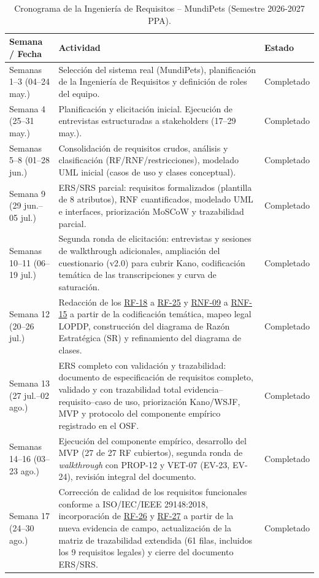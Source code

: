 \documentclass[journal,onecolumn]{IEEEtran}
\begin{document}
	\begin{table}[H]
		\caption{Cronograma de la Ingeniería de Requisitos -- MundiPets (Semestre 2026-2027 PPA).}
		\centering
		
		\begin{tabularx}{\linewidth}{|C{2.5cm}|X|C{2.8cm}|}
			\hline
			\textbf{Semana / Fecha} & \textbf{Actividad} & \textbf{Estado} \\
			\hline
			Semanas 1--3 (04--24 may.) & Selección del sistema real (MundiPets), planificación de la Ingeniería de Requisitos y definición de roles del equipo. & Completado \\
			\hline
			Semana 4 (25--31 may.) & Planificación y elicitación inicial. Ejecución de entrevistas estructuradas a stakeholders (17--29 may.). & Completado \\
			\hline
			Semanas 5--8 (01--28 jun.) & Consolidación de requisitos crudos, análisis y clasificación (RF/RNF/restricciones), modelado UML inicial (casos de uso y clases conceptual). & Completado \\
			\hline
			Semana 9 (29 jun.--05 jul.) & ERS/SRS parcial: requisitos formalizados (plantilla de 8 atributos), RNF cuantificados, modelado UML e interfaces, priorización MoSCoW y trazabilidad parcial. & Completado \\
			\hline
			Semanas 10--11 (06--19 jul.) & Segunda ronda de elicitación: entrevistas y sesiones de walkthrough adicionales, ampliación del cuestionario (v2.0) para cubrir Kano, codificación temática de las transcripciones y curva de saturación. & Completado \\
			\hline
			Semana 12 (20--26 jul.) & Redacción de los \hyperref[tab:RF-18]{RF-18} a \hyperref[tab:RF-25]{RF-25} y \hyperref[tab:RNF-09]{RNF-09} a \hyperref[tab:RNF-15]{RNF-15} a partir de la codificación temática, mapeo legal LOPDP, construcción del diagrama de Razón Estratégica (SR) y refinamiento del diagrama de clases. & Completado \\
			\hline
			Semana 13 (27 jul.--02 ago.) & ERS completo con validación y trazabilidad: documento de especificación de requisitos completo, validado y con trazabilidad total evidencia--requisito--caso de uso, priorización Kano/WSJF, MVP y protocolo del componente empírico registrado en el OSF. & Completado \\
			\hline
			Semanas 14--16 (03--23 ago.) & Ejecución del componente empírico, desarrollo del MVP (27 de 27 RF cubiertos), segunda ronda de \emph{walkthrough} con PROP-12 y VET-07 (EV-23, EV-24), revisión integral del documento. & Completado \\
			\hline
			Semana 17 (24--30 ago.) & Corrección de calidad de los requisitos funcionales conforme a ISO/IEC/IEEE 29148:2018, incorporación de \hyperref[tab:RF-26]{RF-26} y \hyperref[tab:RF-27]{RF-27} a partir de la nueva evidencia de campo, actualización de la matriz de trazabilidad extendida (61 filas, incluidos los 9 requisitos legales) y cierre del documento ERS/SRS. & Completado \\
			\hline
		\end{tabularx}
	\end{table}
	
\end{document}
